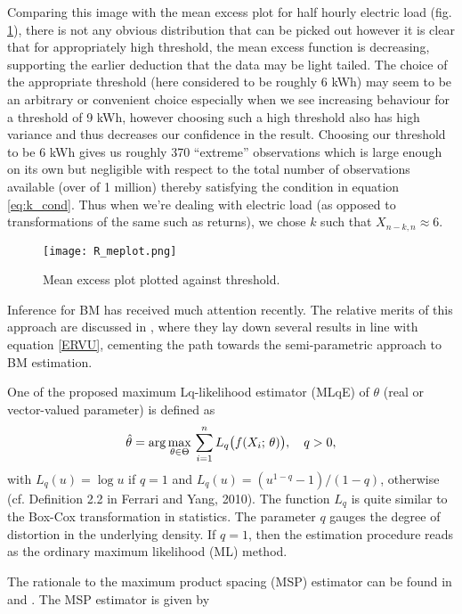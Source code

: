Comparing this image with the mean excess plot for half hourly electric load  (fig. \ref{fig:r_me}), there is not any obvious distribution that can be picked out however it is clear that for appropriately high threshold, the mean excess function is decreasing, supporting the earlier deduction that the data may be light tailed. The choice of the appropriate threshold (here considered to be roughly 6 kWh) may seem to be an arbitrary or convenient choice especially when we see increasing behaviour for a threshold of 9 kWh, however choosing such a high threshold also has high variance and thus decreases our confidence in the result. Choosing our threshold to be 6 kWh gives us roughly 370 ``extreme'' observations which is large enough on its own but negligible with respect to the total number of observations available (over of 1 million) thereby satisfying the condition in equation \ref{eq:k_cond}. Thus when we're dealing with electric load (as opposed to transformations of the same such as returns), we chose $k$ such that $X_{n-k,n} \approx 6$.

\begin{figure}
\centering
\texttt{[image: R\_meplot.png]}
\caption{\label{fig:r_me} Mean excess plot plotted against threshold.}
\end{figure}


Inference for BM has received much attention recently. The relative merits of this approach are discussed in \cite{FdeH:15}, where they lay down several results in line with equation \ref{ERVU}, cementing the path towards the semi-parametric approach to BM estimation.

One of the proposed maximum Lq-likelihood estimator (MLqE) of $\theta$ (real or vector-valued parameter) is defined as
\begin{equation*}
	\hat{\theta}= \displaystyle {\arg\max_{\theta \in \Theta}} \, \sum\limits_{i=1}^{n} L_q\bigl( f(X_i; \, \theta)\bigr), \quad q>0,
\end{equation*}
with $L_q(u)= \log u$ if $q=1$ and $L_q(u)= (u^{1-q}- 1)/(1-q)$, otherwise (cf. Definition 2.2 in Ferrari and Yang, 2010). The function $L_q$ is quite similar to the Box-Cox transformation in statistics. The parameter $q$ gauges the degree of distortion in the underlying density. If $q=1$, then the estimation procedure reads as the ordinary maximum likelihood (ML) method.

The rationale to the maximum product spacing (MSP) estimator can be found in \cite{ChengAmin:79} and \cite{Ranneby:84}. The MSP estimator is given by

